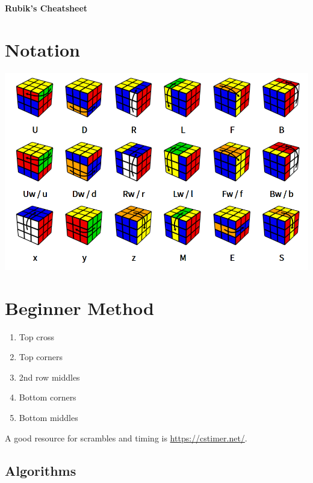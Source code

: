 \documentclass[10pt,landscape]{cheatsheet}
\begin{document}
\footnotesize
\begin{multicols}{3}

\begin{center}
     \Large{\textbf{Rubik's Cheatsheet}}
\end{center}

\section{Notation}
\begin{Figure}
    \centering
    \includegraphics[width=\linewidth]{img/notation.png}
    \label{fig:notation}
\end{Figure}


\section{Beginner Method}

\begin{enumerate}
    \item Top cross
    \item Top corners
    \item 2nd row middles
    \item Bottom corners
    \item Bottom middles
\end{enumerate}

A good resource for scrambles and timing is \url{https://cstimer.net/}.

\subsection{Algorithms}


\end{multicols}
\end{document}
